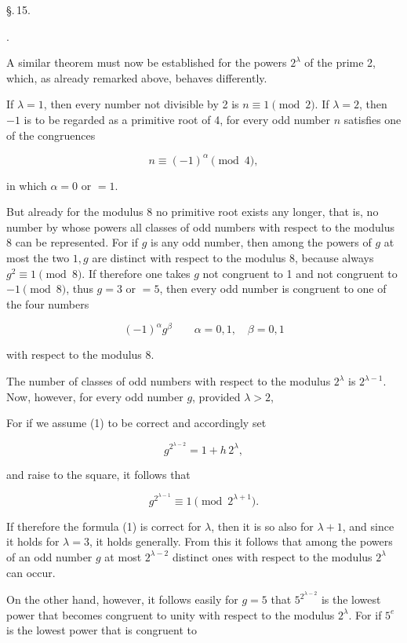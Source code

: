 
\begin{center}
\S.\,15.

.
\end{center}

A similar theorem must now be established for the powers $2^\lambda$ of the prime 2, which, as already remarked above, behaves differently.

If $\lambda = 1$, then every number not divisible by 2 is $n \equiv 1 \pmod{2}$. If $\lambda = 2$, then $-1$ is to be regarded as a primitive root of 4, for every odd number $n$ satisfies one of the congruences

\[
n \equiv (-1)^\alpha \pmod{4},
\]

in which $\alpha = 0$ or $= 1$.

But already for the modulus 8 no primitive root exists any longer, that is, no number by whose powers all classes of odd numbers with respect to the modulus 8 can be represented. For if $g$ is any odd number, then among the powers of $g$ at most the two $1, g$ are distinct with respect to the modulus 8, because always $g^2 \equiv 1 \pmod{8}$. If therefore one takes $g$ not congruent to 1 and not congruent to $-1 \pmod{8}$, thus $g = 3$ or $= 5$, then every odd number is congruent to one of the four numbers

\[
(-1)^\alpha g^\beta \qquad \alpha = 0, 1, \quad \beta = 0, 1
\]

with respect to the modulus 8.

The number of classes of odd numbers with respect to the modulus $2^\lambda$ is $2^{\lambda-1}$. Now, however, for every odd number $g$, provided $\lambda > 2$,


For if we assume (1) to be correct and accordingly set

\[
g^{2^{\lambda-2}} = 1 + h\, 2^\lambda,
\]

and raise to the square, it follows that

\[
g^{2^{\lambda-1}} \equiv 1 \pmod{2^{\lambda+1}}.
\]

If therefore the formula (1) is correct for $\lambda$, then it is so also for $\lambda + 1$, and since it holds for $\lambda = 3$, it holds generally. From this it follows that among the powers of an odd number $g$ at most $2^{\lambda-2}$ distinct ones with respect to the modulus $2^\lambda$ can occur.

On the other hand, however, it follows easily for $g = 5$ that $5^{2^{\lambda-2}}$ is the lowest power that becomes congruent to unity with respect to the modulus $2^\lambda$. For if $5^e$ is the lowest power that is congruent to
